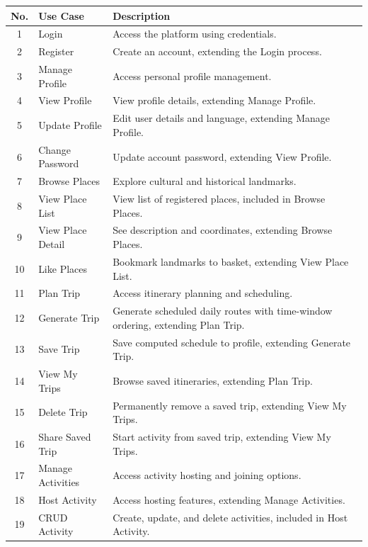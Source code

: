 \documentclass[a4paper,12pt]{report}
\begin{document}
\newpage
\begin{table}[H]
\centering
\small
\renewcommand{\arraystretch}{1.1}
\begin{tabular}{|c|p{4.5cm}|p{9cm}|}
\hline
\textbf{No.} & \textbf{Use Case} & \textbf{Description} \\ \hline
1 & Login & Access the platform using credentials. \\ \hline
2 & Register & Create an account, extending the Login process. \\ \hline
3 & Manage Profile & Access personal profile management. \\ \hline
4 & View Profile & View profile details, extending Manage Profile. \\ \hline
5 & Update Profile & Edit user details and language, extending Manage Profile. \\ \hline
6 & Change Password & Update account password, extending View Profile. \\ \hline
7 & Browse Places & Explore cultural and historical landmarks. \\ \hline
8 & View Place List & View list of registered places, included in Browse Places. \\ \hline
9 & View Place Detail & See description and coordinates, extending Browse Places. \\ \hline
10 & Like Places & Bookmark landmarks to basket, extending View Place List. \\ \hline
11 & Plan Trip & Access itinerary planning and scheduling. \\ \hline
12 & Generate Trip & Generate scheduled daily routes with time-window ordering, extending Plan Trip. \\ \hline
13 & Save Trip & Save computed schedule to profile, extending Generate Trip. \\ \hline
14 & View My Trips & Browse saved itineraries, extending Plan Trip. \\ \hline
15 & Delete Trip & Permanently remove a saved trip, extending View My Trips. \\ \hline
16 & Share Saved Trip & Start activity from saved trip, extending View My Trips. \\ \hline
17 & Manage Activities & Access activity hosting and joining options. \\ \hline
18 & Host Activity & Access hosting features, extending Manage Activities. \\ \hline
19 & CRUD Activity & Create, update, and delete activities, included in Host Activity. \\ \hline

\end{tabular}
\end{table}
\end{document}
